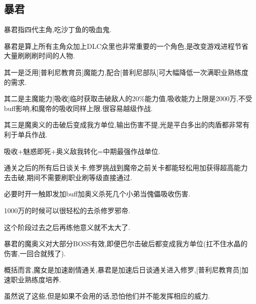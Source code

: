 	\newpage
	\subsection{暴君}

	暴君指四代主角,吃沙丁鱼的吸血鬼.

	暴君是算上所有主角众加上DLC众里也非常重要的一个角色,是改变游戏进程节省大量刷刷刷时间的人物.

	其一是泛用[普利尼教育员]魔能力,配合[普利尼部队]可大幅降低一次满职业熟练度的需求.

	其二是主魔能力[吸收]临时获取击破敌人的20\%能力值,吸收能力上限是2000万,不受buff影响,和魔帝的吸收同样上限.很容易越级作战.

	其三是魔奥义的击破后变成我方单位,输出伤害不提,光是平白多出的肉盾都非常有利于单兵作战.

	吸收+魅惑即死+奥义敌我转化=中期最强作战单位.

	通关之后的所有后日谈关卡,修罗挑战到魔帝之前关卡都能轻松用{\color{red}{即死流}}加{\color{red}{暴君吸收}}获得超高能力去击破,期间不需要刷职业刷等级直接通过.

	必要时开一触即发加buff加奥义杀死几个小弟当傀儡吸收伤害.

	1000万的时候可以很轻松的去杀修罗邪帝.

	这个阶段过去之后再练他意义就不太大了.

	暴君的魔奥义对大部分BOSS有效,即便巴尔击破后都变成我方单位(扛不住水晶的伤害,一回合就残了).

	概括而言,魔女是加速剧情通关,暴君是加速后日谈通关进入修罗,[普利尼教育员]加速职业熟练度培养.

	虽然说了这些,但是如果不会用的话,恐怕他们并不能发挥相应的威力.

